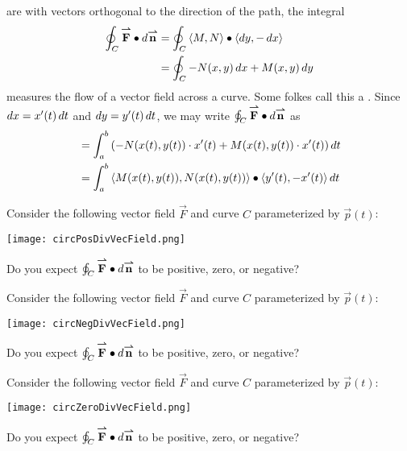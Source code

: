 \documentclass{ximera}
\begin{document}
are with vectors orthogonal to the direction of the path, the integral
\begin{align*}
\oint_C {\overset{\boldsymbol{\rightharpoonup}}{\mathbf{F}}}\bullet \mathop{}\!d {\overset{\boldsymbol{\rightharpoonup}}{\mathbf{n}}} &= \oint_C \left\langle M,N\right\rangle\bullet\left\langle \mathop{}\!d y,-\mathop{}\!d x\right\rangle\\
&= \oint_C - N(x,y)\mathop{}\!d x + M(x,y)\mathop{}\!d y 
\end{align*}
measures the flow of a vector field across a curve. Some folkes call
this a .  Since $\mathop{}\!d x = x'(t)\mathop{}\!d t$ and $\mathop{}\!d y =
y'(t)\mathop{}\!d t$, we may write $\oint_C {\overset{\boldsymbol{\rightharpoonup}}{\mathbf{F}}}\bullet \mathop{}\!d {\overset{\boldsymbol{\rightharpoonup}}{\mathbf{n}}}$ as
\begin{align*}
&= \int_a^b \left(-N(x(t),y(t))\cdot x'(t) + M(x(t),y(t))\cdot  x'(t)\right) \mathop{}\!d t\\
&= \int_a^b \left\langle M(x(t),y(t)),N(x(t),y(t))\right\rangle\bullet\left\langle y'(t), -x'(t)\right\rangle \mathop{}\!d t
\end{align*}

\begin{question}
  Consider the following vector field $\vec{F}$ and curve $C$
  parameterized by $\vec{p}(t)$:
  \begin{image}
    \texttt{[image: circPosDivVecField.png]}
  \end{image}
  Do you expect $\oint_C{\overset{\boldsymbol{\rightharpoonup}}{\mathbf{F}}} \bullet \mathop{}\!d{\overset{\boldsymbol{\rightharpoonup}}{\mathbf{n}}}$ to be positive, zero,
  or negative?
  \begin{prompt}
    \begin{multipleChoice}
    \end{multipleChoice}
  \end{prompt}
  \begin{question}
  Consider the following vector field $\vec{F}$ and curve $C$
  parameterized by $\vec{p}(t)$:
  \begin{image}
    \texttt{[image: circNegDivVecField.png]}
  \end{image}
  Do you expect $\oint_C{\overset{\boldsymbol{\rightharpoonup}}{\mathbf{F}}} \bullet \mathop{}\!d{\overset{\boldsymbol{\rightharpoonup}}{\mathbf{n}}}$ to be positive, zero,
  or negative?
  \begin{prompt}
    \begin{multipleChoice}
    \end{multipleChoice}
  \end{prompt}  \begin{question}
  Consider the following vector field $\vec{F}$ and curve $C$
  parameterized by $\vec{p}(t)$:
  \begin{image}
    \texttt{[image: circZeroDivVecField.png]}
  \end{image}
  Do you expect $\oint_C{\overset{\boldsymbol{\rightharpoonup}}{\mathbf{F}}} \bullet \mathop{}\!d{\overset{\boldsymbol{\rightharpoonup}}{\mathbf{n}}}$ to be positive, zero,
  or negative?
  \begin{prompt}
    \begin{multipleChoice}
    \end{multipleChoice}
  \end{prompt}
  \end{question}
\end{question}
\end{question}
\end{document}

